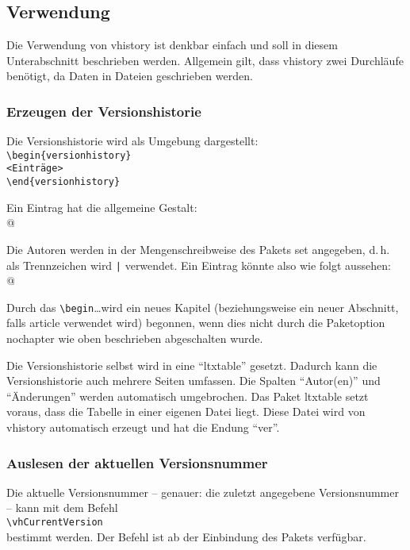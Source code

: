 \subsection{Verwendung}\label{verwendung}
Die Verwendung von vhistory ist denkbar einfach und soll in diesem Unterabschnitt beschrieben werden. Allgemein gilt, dass vhistory zwei Durchläufe benötigt, da Daten in Dateien geschrieben werden.

\subsubsection{Erzeugen der Versionshistorie}\label{begin}
Die Versionshistorie wird als Umgebung dargestellt:\\
\mbox{}\hspace{2em}\verb|\begin{versionhistory}|\\
\mbox{}\hspace{2em}\verb|<Einträge>|\\
\mbox{}\hspace{2em}\verb|\end{versionhistory}|

Ein Eintrag hat die allgemeine Gestalt:\\
\mbox{}\hspace{2em}\verb@{}@

Die Autoren werden in der Mengenschreibweise des Pakets set angegeben, d.\,h. als Trennzeichen wird \texttt{|} verwendet. Ein Eintrag könnte also wie folgt aussehen:\\
\mbox{}\hspace{2em}\verb@{}@

Durch das \verb|\begin|\ldots wird ein neues Kapitel (beziehungsweise ein neuer Abschnitt, falls article verwendet wird) begonnen, wenn dies nicht durch die Paketoption nochapter wie oben beschrieben abgeschalten wurde.

Die Versionshistorie selbst wird in eine "`ltxtable"' gesetzt. Dadurch kann die Versionshistorie auch mehrere Seiten umfassen. Die Spalten "`Autor(en)"' und "`Änderungen"' werden automatisch umgebrochen. Das Paket ltxtable setzt voraus, dass die Tabelle in einer eigenen Datei liegt. Diese Datei wird von vhistory automatisch erzeugt und hat die Endung "`ver"'.

\subsubsection{Auslesen der aktuellen Versionsnummer}
Die aktuelle Versionsnummer -- genauer: die zuletzt angegebene Versionsnummer -- kann mit dem Befehl\\
\mbox{}\hspace{2em}\verb|\vhCurrentVersion|\\
bestimmt werden. Der Befehl ist ab der Einbindung des Pakets verfügbar.

